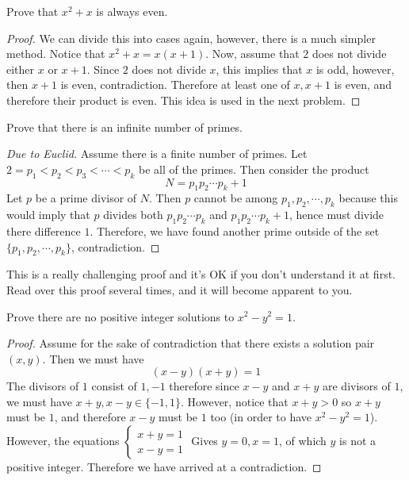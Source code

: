\begin{exmp}  Prove that $x^2+x$ is always even.  \end{exmp}
\begin{proof}  We can divide this into cases again, however, there is a much simpler method.  Notice that $x^2+x=x(x+1)$.  Now, assume that $2$ does not divide either $x$ or $x+1$.  Since $2$ does not divide $x$, this implies that $x$ is odd, however, then $x+1$ is even, contradiction.  Therefore at least one of $x, x+1$ is even, and therefore their product is even.  This idea is used in the next problem.  \end{proof}  
\begin{exmp}  Prove that there is an infinite number of primes.  \end{exmp}
\begin{proof}[Due to Euclid]   Assume there is a finite number of primes.  Let  $2=p_1<p_2<p_3<\cdots<p_k$ be all of the primes.  Then consider the product $$N=p_1p_2\cdots p_k+1$$  Let $p$ be a prime divisor of $N$.  Then $p$ cannot be among $p_1, p_2, \cdots, p_k$ because this would imply that $p$ divides both $p_1p_2\cdots p_k$ and $p_1p_2\cdots p_k+1$, hence must divide there difference $1$.  Therefore, we have found another prime outside of the set $\{p_1, p_2, \cdots, p_k\}$, contradiction.  \end{proof}

This is a really challenging proof and it's OK if you don't understand it at first.  Read over this proof several times, and it will become apparent to you.


\begin{exmp}  Prove there are no positive integer solutions to $x^2-y^2=1$.  \end{exmp}
\begin{proof}  Assume for the sake of contradiction that there exists a solution pair $(x,y)$.  Then we must have $$\left(x-y\right)\left(x+y\right)=1$$  The divisors of $1$ consist of $1,-1$ therefore since $x-y$ and $x+y$ are divisors of $1$, we must have $x+y, x-y \in \{-1, 1\}$.  However, notice that $x+y>0$ so $x+y$ must be $1$, and therefore $x-y$ must be $1$ too (in order to have $x^2-y^2=1$).  However, the equations $\begin{cases} x+y=1 \\ x-y=1 \end{cases}$
Gives $y=0, x=1$, of which $y$ is not a positive integer.  Therefore we have arrived at a contradiction.  \end{proof}

